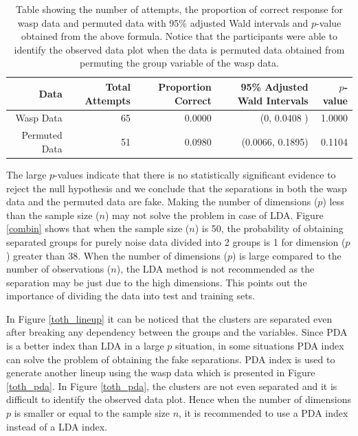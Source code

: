 \documentclass[12]{article}
\begin{document}
\begin{table}[ht]
\begin{center}
\caption{Table showing the number of attempts, the proportion of correct response for wasp data and permuted data with 95\% adjusted Wald intervals and $p$-value obtained from the above formula. Notice that the participants were able to identify the observed data plot when the data is permuted data obtained from permuting the group variable of the wasp data.}
\vspace{0.15cm}
\begin{tabular}{r|rrrr}
\hline
  \hline
 Data & Total Attempts & Proportion Correct & 95\% Adjusted Wald Intervals  & $p$-value\\ 
  \hline
Wasp Data & 65 & 0.0000 & (0,  0.0408  )  & 1.0000\\ 
Permuted Data & 51 & 0.0980 & (0.0066, 0.1895) & 0.1104 \\ 
   \hline
\end{tabular}
\label{wasp}
\end{center}
\end{table}

The large $p$-values indicate that there is no statistically significant evidence to reject the null hypothesis and we conclude that the separations in both the wasp data and the permuted data are fake. Making the number of dimensions ($p$) less than the sample size ($n$) may not solve the problem in case of LDA. Figure \ref{combin} shows that when the sample size ($n$) is 50, the probability of obtaining separated groups for purely noise data divided into 2 groups is 1 for dimension ($p$) greater than 38. When the number of dimensions ($p$) is large compared to the number of observations ($n$), the LDA method is not recommended as the separation may be just due to the high dimensions. This points out the importance of dividing the data into test and training sets.  



In Figure \ref{toth_lineup} it can be noticed that the clusters are separated even after breaking any dependency between the groups and the variables. Since PDA is a better index than LDA in a large $p$ situation, in some situations PDA index can solve the problem of obtaining the fake separations. PDA index is used to generate another lineup using the wasp data which is presented in Figure \ref{toth_pda}. In Figure \ref{toth_pda}, the clusters are not even separated and it is difficult to identify the observed data plot. Hence when the number of dimensions $p$ is smaller or equal to the sample size $n$, it is recommended to use a PDA index instead of a LDA index. 
\end{document}
